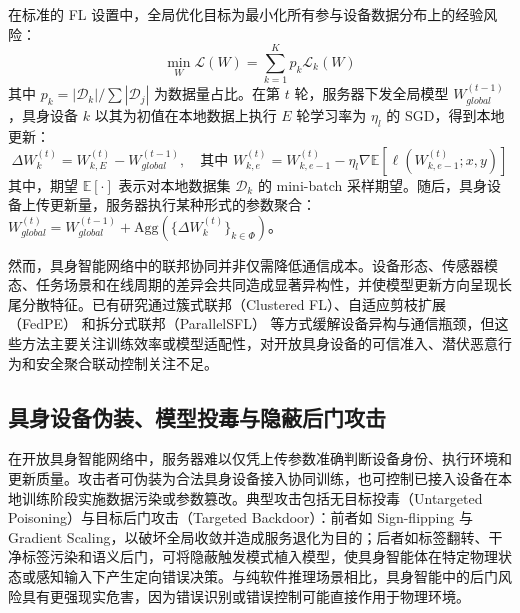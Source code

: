 \documentclass[11pt, a4paper, UTF8, fontset=fandol]{ctexart}
\begin{document}
在标准的 FL 设置中，全局优化目标为最小化所有参与设备数据分布上的经验风险：
\begin{equation}
    \min_{W} \mathcal{L}(W) = \sum_{k=1}^K p_k \mathcal{L}_k(W)
\end{equation}
其中 $p_k = |\mathcal{D}_k| / \sum |\mathcal{D}_j|$ 为数据量占比。在第 $t$ 轮，服务器下发全局模型 $W_{global}^{(t-1)}$，具身设备 $k$ 以其为初值在本地数据上执行 $E$ 轮学习率为 $\eta_l$ 的 SGD，得到本地更新：
\begin{equation}
    \Delta W_{k}^{(t)} = W_{k, E}^{(t)} - W_{global}^{(t-1)}, \quad \text{其中 } W_{k, e}^{(t)} = W_{k, e-1}^{(t)} - \eta_l \nabla \mathbb{E}[\ell(W_{k, e-1}^{(t)}; x, y)]
\end{equation}
其中，期望 $\mathbb{E}[\cdot]$ 表示对本地数据集 $\mathcal{D}_k$ 的 mini-batch 采样期望。随后，具身设备上传更新量，服务器执行某种形式的参数聚合：$W_{global}^{(t)} = W_{global}^{(t-1)} + \mathrm{Agg}(\{ \Delta W_{k}^{(t)} \}_{k\in\Phi})$。

然而，具身智能网络中的联邦协同并非仅需降低通信成本。设备形态、传感器模态、任务场景和在线周期的差异会共同造成显著异构性，并使模型更新方向呈现长尾分散特征。已有研究通过簇式联邦（Clustered FL）\cite{r9_clustered}、自适应剪枝扩展（FedPE）\cite{fedpe} 和拆分式联邦（ParallelSFL）\cite{parallelsfl} 等方式缓解设备异构与通信瓶颈，但这些方法主要关注训练效率或模型适配性，对开放具身设备的可信准入、潜伏恶意行为和安全聚合联动控制关注不足。

\subsection{具身设备伪装、模型投毒与隐蔽后门攻击}
在开放具身智能网络中，服务器难以仅凭上传参数准确判断设备身份、执行环境和更新质量。攻击者可伪装为合法具身设备接入协同训练，也可控制已接入设备在本地训练阶段实施数据污染或参数篡改。典型攻击包括无目标投毒（Untargeted Poisoning）与目标后门攻击（Targeted Backdoor）：前者如 Sign-flipping 与 Gradient Scaling，以破坏全局收敛并造成服务退化为目的；后者如标签翻转、干净标签污染和语义后门，可将隐蔽触发模式植入模型，使具身智能体在特定物理状态或感知输入下产生定向错误决策。与纯软件推理场景相比，具身智能中的后门风险具有更强现实危害，因为错误识别或错误控制可能直接作用于物理环境。
\end{document}
